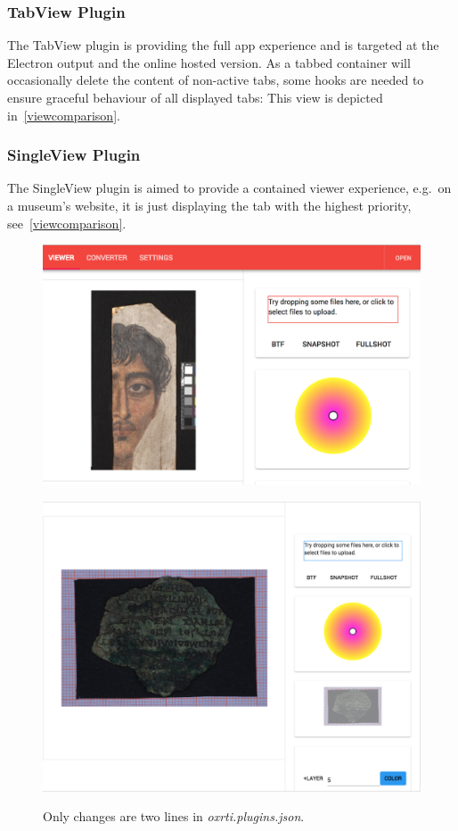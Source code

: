 \subsubsection{TabView Plugin}
The TabView plugin is providing the full app experience and is targeted at the
Electron output and the online hosted version. As a tabbed container will
occasionally delete the content of non-active tabs, some hooks are needed to
ensure graceful behaviour of all displayed tabs:
This view is depicted in~\autoref{viewcomparison}.

\subsubsection{SingleView Plugin}
The SingleView plugin is aimed to provide a contained viewer experience, e.g.\ on
a museum's website, it is just displaying the tab with the highest priority, see~\autoref{viewcomparison}.

\begin{figure}
  \begin{subfloat}
    {\includegraphics[max
    width=0.5\linewidth]{images/tabview}}
\end{subfloat}
\begin{subfloat}
  {\includegraphics[max
    width=0.5\linewidth]{images/singleview}}
\end{subfloat}
\caption[View Comparison]{Only changes are two lines in \emph{oxrti.plugins.json}.}
\label{viewcomparison}
\end{figure}



